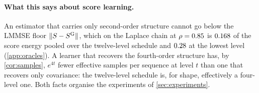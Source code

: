 \paragraph{What this says about score learning.}
An estimator that carries only second-order structure cannot go below the LMMSE floor
$\lVert S-S^{\mathrm{G}}\rVert$, which on the Laplace chain at $\rho=0.85$ is
$0.168$ of the score energy pooled over the twelve-level schedule and
$0.28$ at the lowest level (\cref{app:oracles}). A learner that recovers the
fourth-order structure has, by \cref{cor:samples}, $e^{4t}$ fewer effective samples per
sequence at level $t$ than one that recovers only covariance: the twelve-level schedule
is, for shape, effectively a four-level one. Both facts organise the experiments of
\cref{sec:experiments}.

